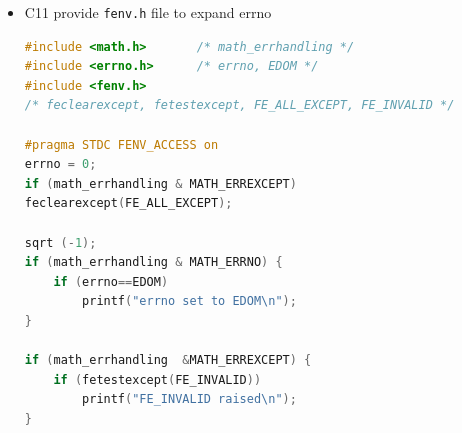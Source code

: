 \documentclass[a4paper,11pt,twoside]{book}
\begin{document}
\begin{itemize}
\item C11 provide \texttt{fenv.h} file to expand errno
\begin{lstlisting}[frame=single, language=c++]
#include <math.h>       /* math_errhandling */
#include <errno.h>      /* errno, EDOM */
#include <fenv.h>
/* feclearexcept, fetestexcept, FE_ALL_EXCEPT, FE_INVALID */
	
#pragma STDC FENV_ACCESS on
errno = 0;
if (math_errhandling & MATH_ERREXCEPT)
feclearexcept(FE_ALL_EXCEPT);
	
sqrt (-1);
if (math_errhandling & MATH_ERRNO) {
	if (errno==EDOM) 
		printf("errno set to EDOM\n");
}
	
if (math_errhandling  &MATH_ERREXCEPT) {
	if (fetestexcept(FE_INVALID)) 
		printf("FE_INVALID raised\n");
}
\end{lstlisting}
	
\end{itemize}
\end{document}
